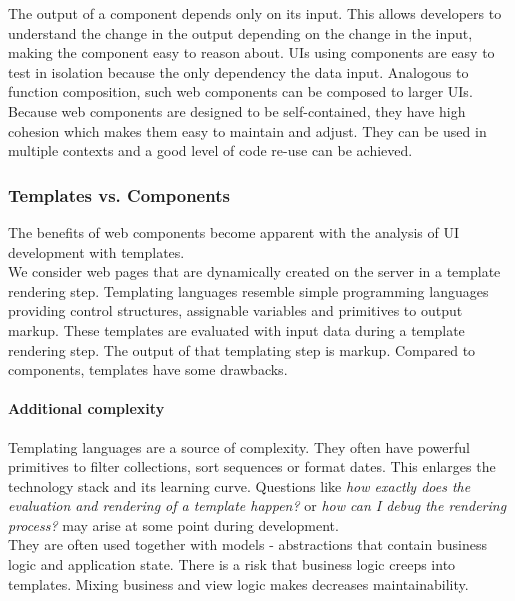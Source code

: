 The output of a component depends only on its input. This allows developers to understand the change in the output depending on the change in the input, making the component easy to reason about. UIs using components are easy to test in isolation because the only dependency the data input. Analogous to function composition, such web components can be composed to larger UIs. Because web components are designed to be self-contained, they have high cohesion which makes them easy to maintain and adjust. They can be used in multiple contexts and a good level of code re-use can be achieved.

\subsubsection{Templates vs. Components}
The benefits of web components become apparent with the analysis of UI development with templates. \\
We consider web pages that are dynamically created on the server in a template rendering step. Templating languages resemble simple programming languages providing control structures, assignable variables and primitives to output markup. These templates are evaluated with input data during a template rendering step. The output of that templating step is markup. Compared to components, templates have some drawbacks.

\paragraph{Additional complexity} Templating languages are a source of complexity. They often have powerful primitives to filter collections, sort sequences or format dates. This enlarges the technology stack and its learning curve. Questions like \textit{how exactly does the evaluation and rendering of a template happen?} or \textit{how can I debug the rendering process?} may arise at some point during development. \\
They are often used together with models - abstractions that contain business logic and application state. There is a risk that business logic creeps into templates. Mixing business and view logic makes decreases maintainability.

